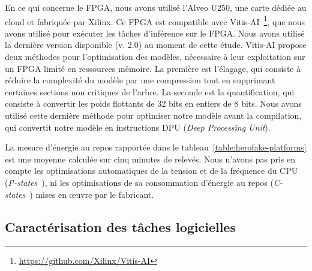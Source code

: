 En ce qui concerne le FPGA, nous avons utilisé l'Alveo U250, une carte dédiée au cloud et fabriquée par Xilinx. Ce FPGA est compatible avec Vitis-AI~\footnote{\href{https://github.com/Xilinx/Vitis-AI}{https://github.com/Xilinx/Vitis-AI}}, que nous avons utilisé pour exécuter les tâches d'inférence sur le FPGA. Nous avons utilisé la dernière version disponible (v. 2.0) au moment de cette étude. Vitis-AI propose deux méthodes pour l'optimisation des modèles, nécessaire à leur exploitation sur un FPGA limité en ressources mémoire. La première est l'élagage, qui consiste à réduire la complexité du modèle par une compression tout en supprimant certaines sections non critiques de l'arbre. La seconde est la quantification, qui consiste à convertir les poids flottants de 32 bits en entiers de 8 bits. Nous avons utilisé cette dernière méthode pour optimiser notre modèle avant la compilation, qui convertit notre modèle en instructions DPU (\textit{Deep Processing Unit}).

La mesure d'énergie au repos rapportée dans le tableau~\ref{table:herofake-platforms} est une moyenne calculée sur cinq minutes de relevés. Nous n'avons pas pris en compte les optimisations automatiques de la tension et de la fréquence du \gls{CPU} (\textit{P-states}~\cite{kwasnickDeterminationCPUUse2011}), ni les optimisations de sa consommation d'énergie au repos (\textit{C-states}~\cite{sueurSlowSleepThat}) mises en œuvre par le fabricant.

\subsection{Caractérisation des tâches logicielles}
\label{section:herofake-offline:workload}

